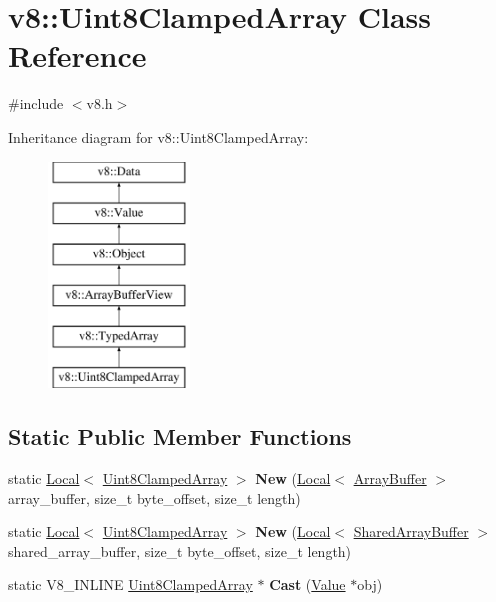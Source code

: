 \hypertarget{classv8_1_1Uint8ClampedArray}{}\section{v8\+:\+:Uint8\+Clamped\+Array Class Reference}
\label{classv8_1_1Uint8ClampedArray}


{\ttfamily \#include $<$v8.\+h$>$}

Inheritance diagram for v8\+:\+:Uint8\+Clamped\+Array\+:\begin{figure}[H]
\begin{center}
\leavevmode
\includegraphics[height=6.000000cm]{classv8_1_1Uint8ClampedArray}
\end{center}
\end{figure}
\subsection*{Static Public Member Functions}
\begin{DoxyCompactItemize}
\item 
static \hyperlink{classv8_1_1Local}{Local}$<$ \hyperlink{classv8_1_1Uint8ClampedArray}{Uint8\+Clamped\+Array} $>$ {\bfseries New} (\hyperlink{classv8_1_1Local}{Local}$<$ \hyperlink{classv8_1_1ArrayBuffer}{Array\+Buffer} $>$ array\+\_\+buffer, size\+\_\+t byte\+\_\+offset, size\+\_\+t length)\hypertarget{classv8_1_1Uint8ClampedArray_abadcd9c3c77b071e21f3140e0ed4411f}{}\label{classv8_1_1Uint8ClampedArray_abadcd9c3c77b071e21f3140e0ed4411f}

\item 
static \hyperlink{classv8_1_1Local}{Local}$<$ \hyperlink{classv8_1_1Uint8ClampedArray}{Uint8\+Clamped\+Array} $>$ {\bfseries New} (\hyperlink{classv8_1_1Local}{Local}$<$ \hyperlink{classv8_1_1SharedArrayBuffer}{Shared\+Array\+Buffer} $>$ shared\+\_\+array\+\_\+buffer, size\+\_\+t byte\+\_\+offset, size\+\_\+t length)\hypertarget{classv8_1_1Uint8ClampedArray_a4f42e014ea0d35b33b6160bab223b4e3}{}\label{classv8_1_1Uint8ClampedArray_a4f42e014ea0d35b33b6160bab223b4e3}

\item 
static V8\+\_\+\+I\+N\+L\+I\+NE \hyperlink{classv8_1_1Uint8ClampedArray}{Uint8\+Clamped\+Array} $\ast$ {\bfseries Cast} (\hyperlink{classv8_1_1Value}{Value} $\ast$obj)\hypertarget{classv8_1_1Uint8ClampedArray_aa1358e0ac24e305af5c90ba71b73fa7c}{}\label{classv8_1_1Uint8ClampedArray_aa1358e0ac24e305af5c90ba71b73fa7c}

\end{DoxyCompactItemize}
